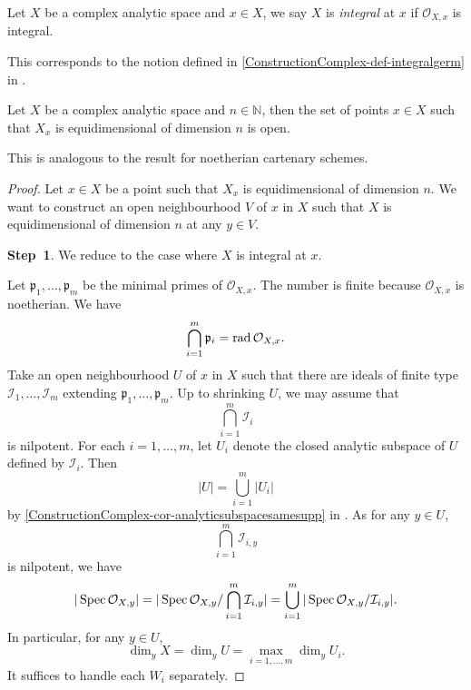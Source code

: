 \begin{definition}
    Let $X$ be a complex analytic space and $x\in X$, we say $X$ is \emph{integral} at $x$ if $\mathcal{O}_{X,x}$ is integral.
\end{definition}
This corresponds to the notion defined in \cref{ConstructionComplex-def-integralgerm} in .

\begin{thm}\label{thm-equidimlocusopen}
    Let $X$ be a complex analytic space and $n\in \mathbb{N}$, then the set of points $x\in X$ such that $X_x$ is equidimensional of dimension $n$ is open. 
\end{thm}
This is analogous to the result for noetherian cartenary schemes.
\begin{proof}
    Let $x\in X$ be a point such that $X_x$ is equidimensional of dimension $n$. 
    We want to construct an open neighbourhood $V$ of $x$ in $X$ such that $X$ is equidimensional of dimension $n$ at any $y\in V$.

    \textbf{Step~1}. We reduce to the case where $X$ is integral at $x$.

    Let $\mathfrak{p}_1,\ldots,\mathfrak{p}_m$ be the minimal primes of $\mathcal{O}_{X,x}$. The number is finite because $\mathcal{O}_{X,x}$ is noetherian. We have
    \[
        \bigcap_{i=1}^m \mathfrak{p}_i=\operatorname{rad} \mathcal{O}_{X,x}.
    \]
    Take an open neighbourhood $U$ of $x$ in $X$  such that there are ideals of finite type $\mathcal{I}_1,\ldots,\mathcal{I}_m$ extending $\mathfrak{p}_1,\ldots,\mathfrak{p}_m$.  Up to shrinking $U$, we may assume that 
    \[
        \bigcap_{i=1}^m \mathcal{I}_i  
    \]
    is nilpotent. For each $i=1,\ldots,m$, let $U_i$ denote the closed analytic subspace of $U$ defined by $\mathcal{I}_i$. Then
    \[
        |U|=\bigcup_{i=1}^m |U_i|  
    \]
    by \cref{ConstructionComplex-cor-analyticsubspacesamesupp} in . 
    As for any $y\in U$,
    \[
        \bigcap_{i=1}^m \mathcal{I}_{i,y} 
    \]
    is nilpotent, we have
    \[
        |\operatorname{Spec} \mathcal{O}_{X,y}|=|\operatorname{Spec} \mathcal{O}_{X,y}/\bigcap_{i=1}^m \mathcal{I}_{i,y} |=\bigcup_{i=1}^m |\operatorname{Spec} \mathcal{O}_{X,y}/\mathcal{I}_{i,y} |.
    \]
    In particular, for any $y\in U$, 
    \[
        \dim_y X=\dim_y U=\max_{i=1,\ldots,m} \dim_y U_i. 
    \]
    It suffices to handle each $W_i$ separately. 


\end{proof}
